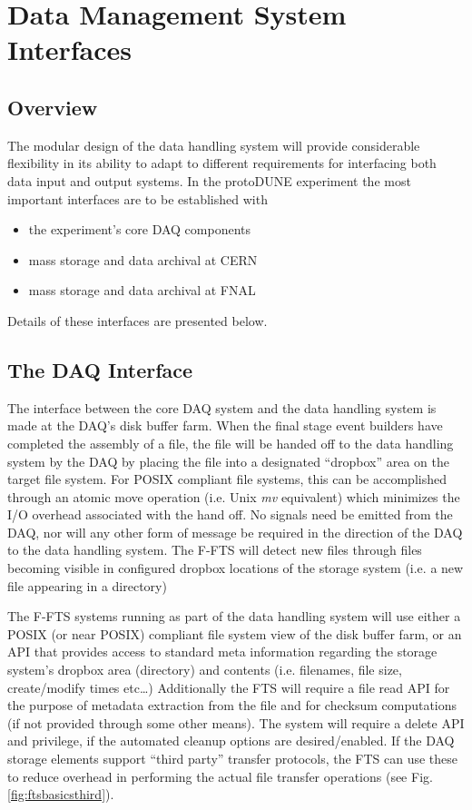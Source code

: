 \documentclass[12pt]{article}
\newcommand{\pd}{protoDUNE\xspace}
\begin{document}
{\section{Data Management System Interfaces}
\subsection{Overview}
The modular design of the data handling system will provide considerable flexibility in its ability to adapt to different requirements
for interfacing  both data input and output systems.  In the \pd experiment the most important interfaces are to be established with
\begin{itemize}
\item the experiment’s core DAQ components
\item mass storage and data archival at CERN
\item mass storage and data archival at FNAL
\end{itemize}

\noindent
 Details of these interfaces are presented below.

\subsection{The DAQ Interface}
The interface between the core DAQ system and the data handling system is made at the DAQ’s disk buffer farm.
When the final stage event builders have completed the assembly of a file, the file will be handed off to the data handling system
by the DAQ by placing the file into a designated ``dropbox'' area on the target file system.  For POSIX compliant file systems,
this can be accomplished through an atomic move operation (i.e. Unix \textit{mv} equivalent) which minimizes the I/O overhead associated
with the hand off.  No signals need be emitted from the DAQ, nor will any other form of message be required in the direction of the
DAQ to the data handling system.  The F-FTS will detect new files through files becoming visible in configured dropbox locations of
the storage system (i.e. a new file appearing in a directory) 

The F-FTS systems running as part of the data handling system will use either a POSIX (or near POSIX) compliant file system view of the disk buffer farm,
or an API that provides access to standard meta information regarding the storage system’s dropbox area (directory) and contents
(i.e. filenames, file size, create/modify times etc…)  Additionally the FTS will require a file read API for the purpose of metadata
extraction from the file and for checksum computations (if not provided through some other means).  The system will require a
delete API and privilege, if the automated cleanup options are desired/enabled.  If the DAQ storage elements support ``third party''
transfer protocols, the FTS can use these to reduce overhead in performing the actual file transfer operations  (see Fig. \ref{fig:ftsbasicsthird}).

}
\end{document}
